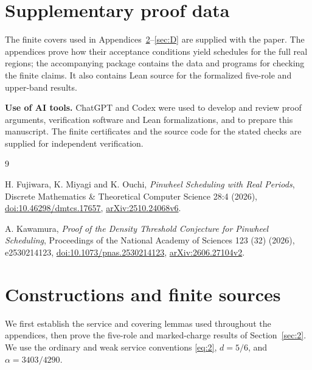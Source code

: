 \documentclass[11pt,a4paper]{article}
\begin{document}
\section{Supplementary proof data}\label{sec:5}

The finite covers used in Appendices~\ref{sec:A}--\ref{sec:D} are supplied with the paper. The appendices prove how their acceptance conditions yield schedules for the full real regions; the accompanying package contains the data and programs for checking the finite claims. It also contains Lean source for the formalized five-role and upper-band results.

\textbf{Use of AI tools.} ChatGPT and Codex were used to develop and review proof arguments, verification software and Lean formalizations, and to prepare this manuscript. The finite certificates and the source code for the stated checks are supplied for independent verification.

\begin{thebibliography}{9}\raggedright


H. Fujiwara, K. Miyagi and K. Ouchi, \emph{Pinwheel Scheduling with Real Periods}, Discrete Mathematics \& Theoretical Computer Science 28:4 (2026), \href{https://doi.org/10.46298/dmtcs.17657}{doi:10.46298/dmtcs.17657}, \href{https://arxiv.org/abs/2510.24068v6}{arXiv:2510.24068v6}.


A. Kawamura, \emph{Proof of the Density Threshold Conjecture for Pinwheel Scheduling}, Proceedings of the National Academy of Sciences 123 (32) (2026), e2530214123, \href{https://doi.org/10.1073/pnas.2530214123}{doi:10.1073/pnas.2530214123}, \href{https://arxiv.org/abs/2606.27104v2}{arXiv:2606.27104v2}.

\end{thebibliography}

\appendix
{}

\section{Constructions and finite sources}\label{sec:A}

We first establish the service and covering lemmas used throughout the appendices, then prove the five-role and marked-charge results of Section~\ref{sec:2}. We use the ordinary and weak service conventions \eqref{eq:2}, \(d=5/6\), and \(\alpha=3403/4290\).
\end{document}

